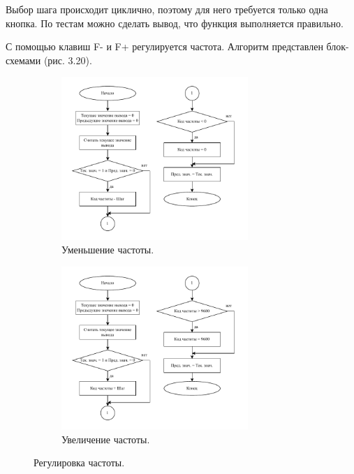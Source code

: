 	Выбор шага происходит циклично, поэтому для него требуется только одна кнопка. По тестам можно сделать вывод, что функция выполняется правильно. 
	
	С помощью клавиш F- и F+ регулируется частота. Алгоритм представлен блок-схемами (рис. 3.20).
	
	\begin{figure}[H]
     \begin{subfigure}[H]{1\textwidth}
         \centering
         \includegraphics[width=0.775\textwidth]{../image/minus_freq.pdf}
         \caption{Уменьшение частоты.}
     \end{subfigure}
     \hfill
     \begin{subfigure}[H]{1\textwidth}
         \centering
         \includegraphics[width=0.775\textwidth]{../image/plus_freq.pdf}
         \caption{Увеличение частоты.}
     \end{subfigure}
        \caption{Регулировка частоты.}
	\end{figure}
	
